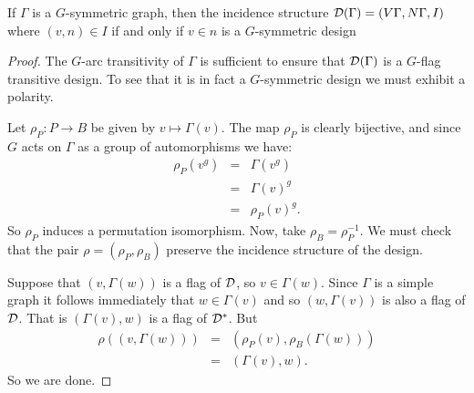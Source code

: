 \begin{proposition}
If \/ $\Gamma$ is a $G$-symmetric graph,
then the incidence structure $\mathcal{D}(\Gamma) = (V \Gamma, N \Gamma,I)$
where $(v,n) \in I$ if and only if $v \in n$ is a $G$-symmetric design
\begin{proof}
The $G$-arc transitivity of $\Gamma$ is sufficient to ensure
that $\mathcal{D}(\Gamma)$ is a $G$-flag transitive design.
To see that it is in fact
a $G$-symmetric design we must exhibit a polarity.

Let $\rho_P : P \to B$ be given by $v \mapsto \Gamma(v)$.
The map $\rho_P$ is clearly bijective, and since $G$ acts on $\Gamma$
as a group of automorphisms we have:
\begin{eqnarray*}
\rho_P(v^g) & = & \Gamma(v^g) \\
            & = & \Gamma(v)^g \\
	                & = & \rho_P(v)^g.
			\end{eqnarray*}
			So $\rho_P$ induces a permutation isomorphism.
			Now, take $\rho_B = \rho_P^{-1}$.
			We must check that the pair $\rho = (\rho_P, \rho_B)$ preserve
			the incidence structure of the design.

Suppose that $(v,\Gamma(w))$ is a flag of $\mathcal{D}$, so $v \in \Gamma(w)$.
Since $\Gamma$ is a simple graph it follows immediately that $w \in \Gamma(v)$
and so $(w, \Gamma(v))$ is also a flag of $\mathcal{D}$.
That is $(\Gamma(v), w)$ is a flag of $\mathcal{D}^{*}$.
But
\begin{eqnarray*}
\rho((v, \Gamma(w))) & = & (\rho_P(v), \rho_B(\Gamma(w))) \\
                     & = & (\Gamma(v), w).
		     \end{eqnarray*}
		     So we are done.

		     \end{proof}
		     \end{proposition}


